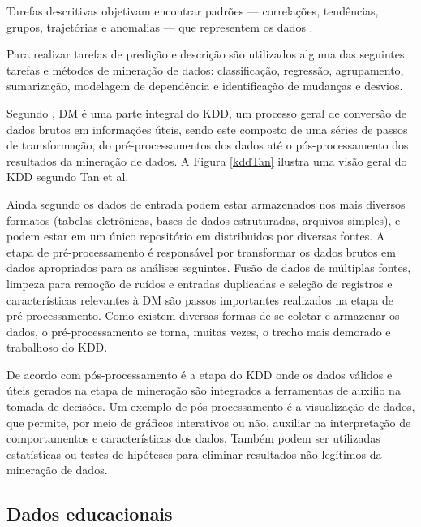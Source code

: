 Tarefas descritivas objetivam encontrar padrões --- correlações, tendências,
grupos, trajetórias e anomalias --- que representem os dados
\cite{fayyad1996data}.

Para realizar tarefas de predição e descrição são utilizados alguma das
seguintes tarefas e métodos de mineração de dados: classificação, regressão,
agrupamento, sumarização, modelagem de dependência e identificação de mudanças e
desvios.

Segundo , DM é uma parte integral do KDD, um
processo geral de conversão de dados brutos em informações úteis, sendo este
composto de uma séries de passos de transformação, do pré-processamentos dos
dados até o pós-processamento dos resultados da mineração de dados. A Figura
\ref{kddTan} ilustra uma visão geral do KDD segundo Tan et al.


Ainda segundo  os dados de entrada podem estar
armazenados nos mais diversos formatos (tabelas eletrônicas, bases de dados
estruturadas, arquivos simples), e podem estar em um único repositório em
distribuidos por diversas fontes. A etapa de pré-processamento é responsável por
transformar os dados brutos em dados apropriados para as análises seguintes.
Fusão de dados de múltiplas fontes, limpeza para remoção de ruídos e entradas
duplicadas e seleção de registros e características relevantes à DM são passos
importantes realizados na etapa de pré-processamento. Como existem diversas
formas de se coletar e armazenar os dados, o pré-processamento se torna, muitas
vezes, o trecho mais demorado e trabalhoso do KDD.

De acordo com  pós-processamento é a etapa do KDD
onde os dados válidos e úteis gerados na etapa de mineração são integrados a
ferramentas de auxílio na tomada de decisões. Um exemplo de pós-processamento é
a visualização de dados, que permite, por meio de gráficos interativos ou não,
auxiliar na interpretação de comportamentos e características dos dados. Também
podem ser utilizadas estatísticas ou testes de hipóteses para eliminar
resultados não legítimos da mineração de dados.

\subsection{Dados educacionais}

